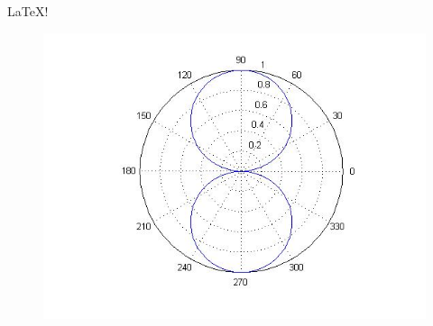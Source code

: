 \documentclass{article}
\begin{document}
\LaTeX!
\begin{figure}
\includegraphics[width=0.6\linewidth]{pictures/antenna_polar.jpg}
\end{figure}
\end{document}
